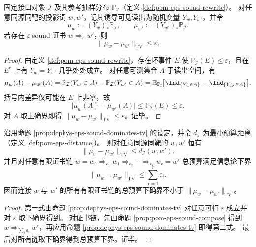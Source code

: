 \begin{proposition}[误差预算支配读出分布的全变差]\label{prop:dephys-eps-sound-dominates-tv}
固定接口对象 \(\mathcal I\) 及其参考抽样分布 \(\mathbb{P}_{\mathcal I}\)（定义 \ref{def:pom-eps-sound-rewrite}）。
对任意同源同靶的投影词 \(w,w'\)，记其诱导可见读出为随机变量 \(Y_w,Y_{w'}\)，并令
\[
\mu_w:=(Y_w)_*\mathbb{P}_{\mathcal I},
\qquad
\mu_{w'}:=(Y_{w'})_*\mathbb{P}_{\mathcal I}.
\]
若存在 \(\varepsilon\)-sound 证书 \(w\Longrightarrow_{\varepsilon}w'\)，则
\[
\boxed{\;\|\mu_w-\mu_{w'}\|_{\mathrm{TV}}\le \varepsilon.\;}
\]
\end{proposition}
\begin{proof}
由定义 \ref{def:pom-eps-sound-rewrite}，存在坏事件 \(E\) 使 \(\mathbb{P}_{\mathcal I}(E)\le \varepsilon\)，且在 \(E^c\) 上有 \(Y_w=Y_{w'}\) 几乎处处成立。
对任意可测集合 \(A\) 于读出空间，有
\[
\mu_w(A)-\mu_{w'}(A)=\mathbb{P}_{\mathcal I}(Y_w\in A)-\mathbb{P}_{\mathcal I}(Y_{w'}\in A)
=\mathbb{E}_{\mathbb{P}_{\mathcal I}}\!\bigl[\ind_{\{Y_w\in A\}}-\ind_{\{Y_{w'}\in A\}}\bigr].
\]
括号内差异仅可能在 \(E\) 上非零，故
\[
\bigl|\mu_w(A)-\mu_{w'}(A)\bigr|
\le \mathbb{P}_{\mathcal I}(E)\le \varepsilon.
\]
对 \(A\) 取上确界即得 \(\|\mu_w-\mu_{w'}\|_{\mathrm{TV}}\le \varepsilon\)。证毕。
\end{proof}

\begin{corollary}\label{cor:dephys-budget-distance-dominates-tv}
沿用命题 \ref{prop:dephys-eps-sound-dominates-tv} 的设定，并令 \(d_{\mathcal I}\) 为最小预算距离（定义 \ref{def:pom-eps-distance}）。
则对任意同源同靶的 \(w,w'\) 恒有
\[
\boxed{\;\|\mu_w-\mu_{w'}\|_{\mathrm{TV}}\le d_{\mathcal I}(w,w').\;}
\]
并且对任意有限证书链
\(
w=w_0\Longrightarrow_{\varepsilon_1}w_1\Longrightarrow_{\varepsilon_2}\cdots\Longrightarrow_{\varepsilon_r}w_r=w'
\)
总预算满足信息论下界
\[
\|\mu_w-\mu_{w'}\|_{\mathrm{TV}}\le \sum_{i=1}^r\varepsilon_i.
\]
因而连接 \(w\) 与 \(w'\) 的所有有限证书链的总预算下确界不小于 \(\|\mu_w-\mu_{w'}\|_{\mathrm{TV}}\)。
\end{corollary}
\begin{proof}
第一式由命题 \ref{prop:dephys-eps-sound-dominates-tv} 对任意可行 \(\varepsilon\) 成立并对 \(\varepsilon\) 取下确界得到。
对证书链，先由命题 \ref{prop:pom-eps-sound-compose} 得到 \(w\Longrightarrow_{\sum_i\varepsilon_i}w'\)，再应用命题 \ref{prop:dephys-eps-sound-dominates-tv} 即得第二式。
最后对所有链取下确界得到总预算下界。证毕。
\end{proof}

